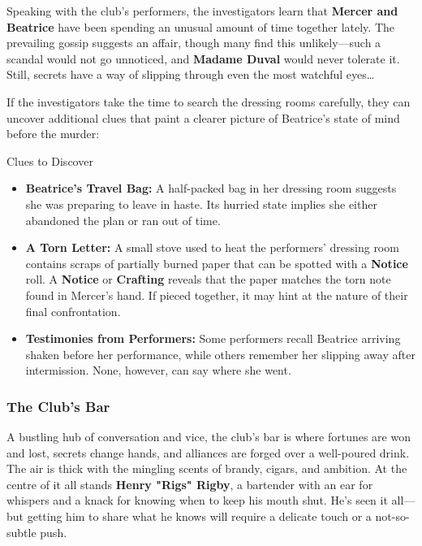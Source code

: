 Speaking with the club’s performers, the in\-ves\-ti\-ga\-tors learn that \textbf{Mercer and Beatrice} have been spending an unusual amount of time together lately. The prevailing gossip suggests an affair, though many find this unlikely—such a scandal would not go unnoticed, and \textbf{Madame Duval} would never tolerate it. Still, secrets have a way of slipping through even the most watchful eyes…


If the investigators take the time to search the dressing rooms carefully, they can uncover additional clues that paint a clearer picture of Beatrice’s state of mind before the murder:  

\begin{CommentBox}{Clues to Discover}
	\begin{itemize}\raggedright
		\item \textbf{Beatrice’s Travel Bag:} A half-packed bag in her dressing room suggests she was preparing to leave in haste. Its hurried state implies she either abandoned the plan or ran out of time.
		\item \textbf{A Torn Letter:} A small stove used to heat the performers' dressing room contains scraps of partially burned paper that can be spotted with a  \textbf{Notice} roll. A  \textbf{Notice} or \textbf{Crafting} reveals that the paper matches the torn note found in Mercer’s hand. If pieced together, it may hint at the nature of their final confrontation.
		\item \textbf{Testimonies from Performers:} Some performers recall Beatrice arriving shaken before her performance, while others remember her slipping away after intermission. None, however, can say where she went.
	\end{itemize}
\end{CommentBox}



\subsubsection{The Club’s Bar}  
A bustling hub of conversation and vice, the club’s bar is where fortunes are won and lost, secrets change hands, and alliances are forged over a well-poured drink. The air is thick with the mingling scents of brandy, cigars, and ambition. At the centre of it all stands \textbf{Henry "Rigs" Rigby}, a bartender with an ear for whispers and a knack for knowing when to keep his mouth shut. He’s seen it all—but getting him to share what he knows will require a delicate touch or a not-so-subtle push.


